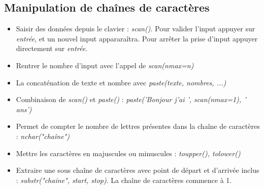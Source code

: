 \documentclass[12pt,a4paper]{article}
\begin{document}
\subsection{Manipulation de chaînes de caractères}
\begin{itemize}
\item Saisir des données depuis le clavier : \textit{scan()}. Pour valider l'input appuyer sur \textit{entrée}, et un nouvel input appararaîtra. Pour arrêter la prise d'input appuyer directement sur \textit{entrée}.
\item Rentrer le nombre d'input avec l'appel de \textit{scan(nmax=n)}
\item La concaténation de texte et nombre avec \textit{paste(texte, nombres, ...)}
\item Combinaison de \textit{scan()} et \textit{paste()} : \textit{paste('Bonjour j'ai ', scan(nmax=1), ' ans')}
\item Permet de compter le nombre de lettres présentes dans la chaîne de caractères : \textit{nchar("chaîne")}
\item Mettre les caractères en majuscules ou minuscules : \textit{toupper(), tolower()}
\item Extraire une sous chaîne de caractères avec point de départ et d'arrivée inclus : \textit{substr("chaine", start, stop)}. La chaîne de caractères commence à 1.
\end{itemize}
\end{document}
